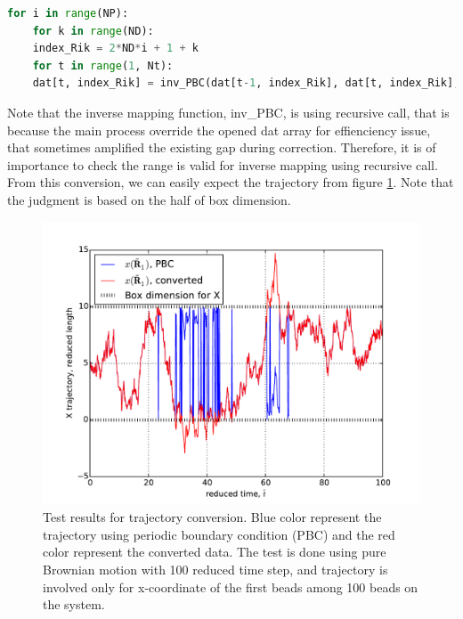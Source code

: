 \documentclass[10pt, a4paper]{report}
\begin{document}
\begin{appendices}
\begin{lstlisting}[language=Python, frame=single]
    for i in range(NP):
    for k in range(ND):
    index_Rik = 2*ND*i + 1 + k
    for t in range(1, Nt):
    dat[t, index_Rik] = inv_PBC(dat[t-1, index_Rik], dat[t, index_Rik], LB)
  \end{lstlisting}
  Note that the inverse mapping function, inv{\_}PBC, is using recursive call, that is because the main process override the opened dat array for effienciency issue, that sometimes amplified the existing gap during correction. Therefore, it is of importance to check the range is valid for inverse mapping using recursive call.
  From this conversion, we can easily expect the trajectory from figure \ref{fig:traj_conv}. Note that the judgment is based on the half of box dimension. 
  \begin{figure}
    \centering
    \includegraphics[width=\textwidth]{figures/converting_trajectory.pdf}
    \caption{Test results for trajectory conversion. Blue color represent the trajectory using periodic boundary condition (PBC) and the red color represent the converted data. The test is done using pure Brownian motion with 100 reduced time step, and trajectory is involved only for x-coordinate of the first beads among 100 beads on the system.}
    \label{fig:traj_conv}
  \end{figure}


\end{appendices}
\end{document}
